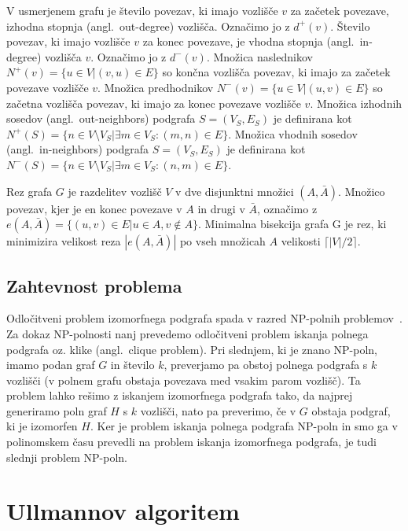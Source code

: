 \documentclass[a4paper, 12pt, ]{book}
\begin{document}
	V usmerjenem grafu je število povezav, ki imajo vozlišče $v$ za začetek
	povezave, 	izhodna stopnja (angl.~out-degree) vozlišča. Označimo jo z $d^+(v)$.
	Število povezav, ki imajo vozlišče $v$ za konec povezave, je vhodna stopnja (angl.~in-degree) vozlišča $v$. Označimo jo z $d^-(v)$.
	Množica naslednikov
	$N^+(v) = \{u \in V \big| (v,u) \in E\}$
	so končna vozlišča povezav, ki imajo za začetek povezave vozlišče $v$.
	Množica predhodnikov 
	$N^-(v) = \{u \in V \big| (u,v) \in E\}$
	so začetna vozlišča povezav, ki imajo za konec povezave vozlišče $v$. 
	Množica izhodnih sosedov (angl.~out-neighbors) podgrafa $S = (V_S, E_S)$ je definirana kot 
	$N^+(S) = \{ n \in V \setminus V_S \big| \exists m \in V_S : (m,n) \in E \}$.
	Množica vhodnih sosedov (angl.~in-neighbors) podgrafa $S = (V_S, E_S)$ je definirana kot 
	$N^-(S) = \{ n \in V \setminus V_S \big| \exists m \in V_S : (n,m) \in E \}$.

	Rez grafa $G$ je razdelitev vozlišč $V$ v dve disjunktni množici $(A, \bar A)$. Množico povezav, kjer je en konec povezave v $A$ in drugi v
	 $\bar A$, označimo z $e(A, \bar A) = \{(u,v) \in E \big| u \in A, v \not \in A\}$. Minimalna bisekcija  grafa G je rez, ki minimizira velikost reza 
	$| e(A, \bar A) |$ po vseh množicah $A$ velikosti $\lceil | V | / 2 \rceil$.



	\section{Zahtevnost problema}
	Odločitveni problem izomorfnega podgrafa spada v razred NP-polnih problemov~\cite{npcomplete}. Za dokaz NP-polnosti nanj prevedemo odločitveni
	problem iskanja polnega podgrafa oz. klike (angl.~clique problem). Pri slednjem, ki je znano NP-poln, imamo podan graf $G$ in
	število $k$, preverjamo pa obstoj polnega podgrafa s $k$ vozlišči (v polnem grafu obstaja povezava med vsakim parom vozlišč). Ta problem lahko rešimo 
	z iskanjem izomorfnega podgrafa tako, da najprej generiramo poln graf $H$ s $k$ vozlišči, nato pa preverimo, če v $G$ obstaja podgraf, ki je izomorfen
	$H$. Ker je problem iskanja polnega podgrafa NP-poln in smo ga v polinomskem času prevedli na problem iskanja izomorfnega podgrafa, je tudi 
	slednji problem NP-poln.






\chapter{Ullmannov algoritem}
	
\end{document}
